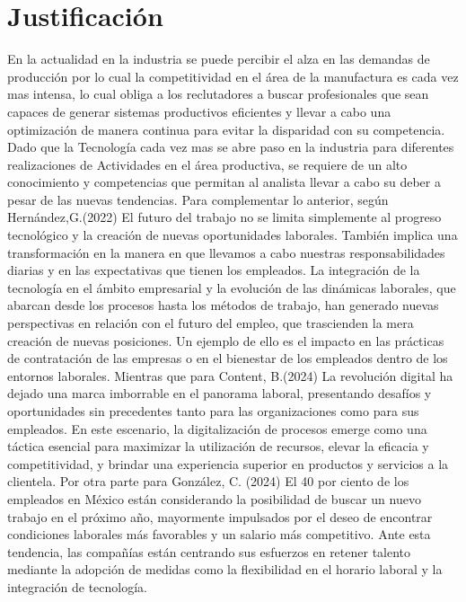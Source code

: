     \section{Justificación}
    En la actualidad en la industria se puede percibir el alza en las demandas de producción por lo cual la competitividad en el área de la manufactura es cada vez mas intensa, lo cual obliga a los reclutadores a buscar profesionales que sean capaces de generar sistemas productivos eficientes y llevar a cabo una optimización de manera continua para evitar la disparidad con su competencia.
    Dado que la Tecnología cada vez mas se abre paso en la industria para diferentes realizaciones de Actividades en el área productiva, se requiere de un alto conocimiento y competencias que permitan al analista 
    llevar a cabo su deber a pesar de las nuevas tendencias.
    Para complementar lo anterior, según Hernández,G.(2022) El futuro del trabajo no se limita simplemente al progreso tecnológico y la creación de nuevas oportunidades laborales. También implica una transformación en la manera en que llevamos a cabo nuestras responsabilidades diarias y en las expectativas que tienen los empleados. La integración de la tecnología en el ámbito empresarial y la evolución de las dinámicas laborales, que abarcan desde los procesos hasta los métodos de trabajo, han generado nuevas perspectivas en relación con el futuro del empleo, que trascienden la mera creación de nuevas posiciones. Un ejemplo de ello es el impacto en las prácticas de contratación de las empresas o en el bienestar de los empleados dentro de los entornos laborales.
    Mientras que para Content, B.(2024) La revolución digital ha dejado una marca imborrable en el panorama laboral, presentando desafíos y oportunidades sin precedentes tanto para las organizaciones como para sus empleados. En este escenario, la digitalización de procesos emerge como una táctica esencial para maximizar la utilización de recursos, elevar la eficacia y competitividad, y brindar una experiencia superior en productos y servicios a la clientela.
    Por otra parte para González, C. (2024)
    El 40 por ciento de los empleados en México están considerando la posibilidad de buscar un nuevo trabajo en el próximo año, mayormente impulsados por el deseo de encontrar condiciones laborales más favorables y un salario más competitivo. Ante esta tendencia, las compañías están centrando sus esfuerzos en retener talento mediante la adopción de medidas como la flexibilidad en el horario laboral y la integración de tecnología. 
